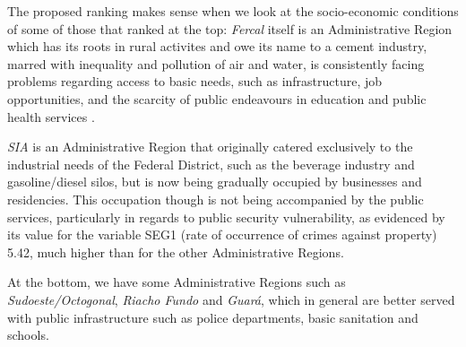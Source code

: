 \documentclass[conference]{IEEEtran}
\begin{document}
The proposed ranking makes sense when we look at the socio-economic conditions of some of those that ranked at the top: \textit{Fercal} itself is an Administrative Region which has its roots in rural activites and owe its name to a cement industry, marred with inequality and pollution of air and water, is consistently facing problems regarding access to basic needs, such as infrastructure, job opportunities, and the scarcity of public endeavours in education and public health services \cite{santos2016percepccoes}.

\textit{SIA} is an Administrative Region that originally catered exclusively to the industrial needs of the Federal District, such as the beverage industry and gasoline/diesel silos, but is now being gradually occupied by businesses and residencies. This occupation though is not being accompanied by the public services, particularly in regards to public security vulnerability, as evidenced by its value for the variable SEG1 (rate of occurrence of crimes against property) 5.42, much higher than for the other Administrative Regions. 


At the bottom, we have some Administrative Regions such as \textit{Sudoeste/Octogonal}, \textit{Riacho Fundo} and \textit{Guará}, which in general are better served with public infrastructure such as police departments, basic sanitation and schools.


\end{document}
